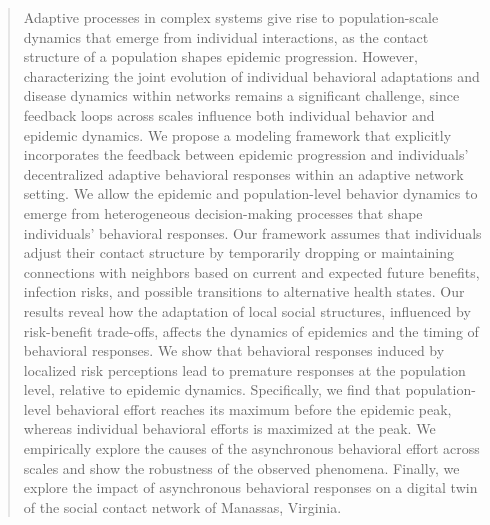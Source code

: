 \documentclass[9pt,twocolumn,twoside]{pnas-new}
\begin{document}
\begin{abstract} %
Adaptive processes in complex systems give rise to population-scale dynamics that emerge from individual interactions, as the contact structure of a population shapes epidemic progression.
However, characterizing the joint evolution of individual behavioral adaptations and disease dynamics within networks remains a significant challenge, since feedback loops across scales influence both individual behavior and epidemic dynamics.
%
We propose a modeling framework that explicitly incorporates the feedback between epidemic progression and individuals' decentralized adaptive behavioral responses within an adaptive network setting. We allow the epidemic and population-level behavior dynamics to emerge from heterogeneous decision-making processes that shape individuals' behavioral responses.
%
Our framework assumes that individuals adjust their contact structure by temporarily dropping or maintaining connections with neighbors based on current and expected future benefits, infection risks, and possible transitions to alternative health states.
%
Our results reveal how the adaptation of local social structures, influenced by risk-benefit trade-offs, affects the dynamics of epidemics and the timing of behavioral responses.
%
We show that behavioral responses induced by localized risk perceptions lead to premature responses at the population level, relative to epidemic dynamics.
Specifically, we find that population-level behavioral effort reaches its maximum before the epidemic peak, whereas individual behavioral efforts is maximized at the peak.
%
We empirically explore the causes of the asynchronous behavioral effort across scales and show the robustness of the observed phenomena. Finally, we explore the impact of asynchronous behavioral responses on a digital twin of the social contact network of Manassas, Virginia.
\end{abstract}


\maketitle
\thispagestyle{firststyle}


\end{document}
